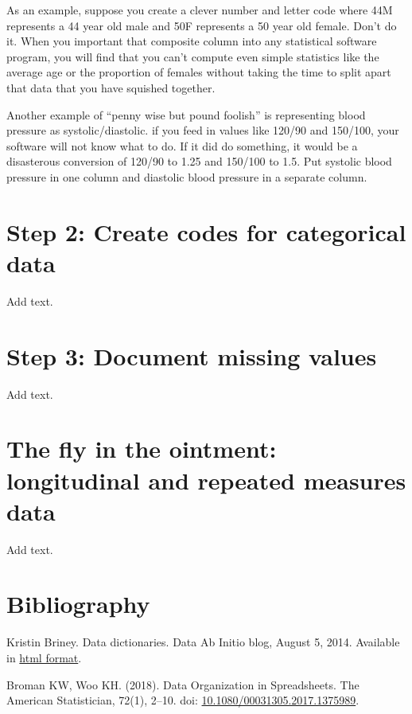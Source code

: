 \documentclass[
  letterpaper,
  DIV=11,
  numbers=noendperiod]{scrreprt}
\begin{document}
As an example, suppose you create a clever number and letter code where
44M represents a 44 year old male and 50F represents a 50 year old
female. Don't do it. When you important that composite column into any
statistical software program, you will find that you can't compute even
simple statistics like the average age or the proportion of females
without taking the time to split apart that data that you have squished
together.

Another example of ``penny wise but pound foolish'' is representing
blood pressure as systolic/diastolic. if you feed in values like 120/90
and 150/100, your software will not know what to do. If it did do
something, it would be a disasterous conversion of 120/90 to 1.25 and
150/100 to 1.5. Put systolic blood pressure in one column and diastolic
blood pressure in a separate column.

\section{Step 2: Create codes for categorical
data}\label{step-2-create-codes-for-categorical-data}

Add text.

\section{Step 3: Document missing
values}\label{step-3-document-missing-values}

Add text.

\section{The fly in the ointment: longitudinal and repeated measures
data}\label{the-fly-in-the-ointment-longitudinal-and-repeated-measures-data}

Add text.

\section{Bibliography}\label{bibliography-8}

Kristin Briney. Data dictionaries. Data Ab Initio blog, August 5, 2014.
Available in \href{http://dataabinitio.com/?p=454\%C2\%A0.}{html
format}.

Broman KW, Woo KH. (2018). Data Organization in Spreadsheets. The
American Statistician, 72(1), 2--10. doi:
\href{https://doi.org/10.1080/00031305.2017.1375989}{10.1080/00031305.2017.1375989}.
\end{document}
